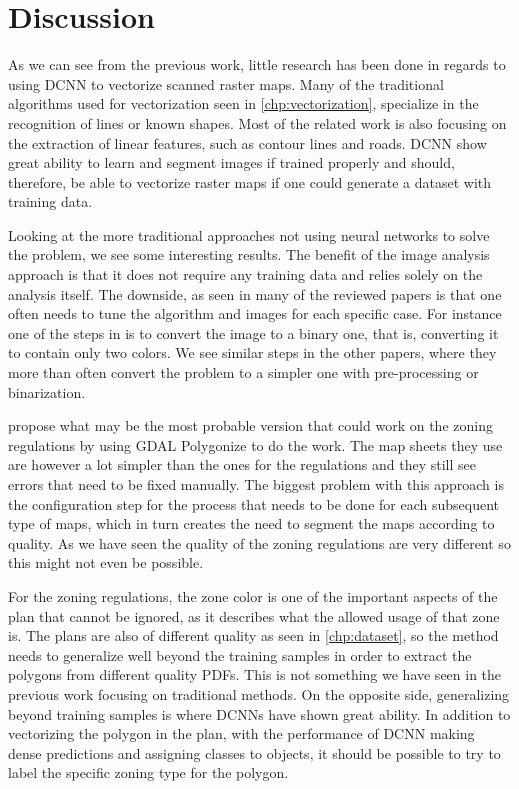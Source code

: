 \chapter{Discussion}
As we can see from the previous work, little research has been done in regards to using DCNN to vectorize scanned raster maps. Many of the traditional algorithms used for vectorization seen in \autoref{chp:vectorization}, specialize in the recognition of lines or known shapes. Most of the related work is also focusing on the extraction of linear features, such as contour lines and roads. DCNN show great ability to learn and segment images if trained properly and should, therefore, be able to vectorize raster maps if one could generate a dataset with training data.

Looking at the more traditional approaches not using neural networks to solve the problem, we see some interesting results. The benefit of the image analysis approach is that it does not require any training data and relies solely on the analysis itself. The downside, as seen in many of the reviewed papers is that one often needs to tune the algorithm and images for each specific case. For instance one of the steps in \citet{Iosifescu2016} is to convert the image to a binary one, that is, converting it to contain only two colors. We see similar steps in the other papers, where they more than often convert the problem to a simpler one with pre-processing or binarization. 

\citet{GiraldoArteaga2013} propose what may be the most probable version that could work on the zoning regulations by using GDAL Polygonize to do the work. The map sheets they use are however a lot simpler than the ones for the regulations and they still see errors that need to be fixed manually. The biggest problem with this approach is the configuration step for the process that needs to be done for each subsequent type of maps, which in turn creates the need to segment the maps according to quality. As we have seen the quality of the zoning regulations are very different so this might not even be possible.

For the zoning regulations, the zone color is one of the important aspects of the plan that cannot be ignored, as it describes what the allowed usage of that zone is. The plans are also of different quality as seen in \autoref{chp:dataset}, so the method needs to generalize well beyond the training samples in order to extract the polygons from different quality PDFs. This is not something we have seen in the previous work focusing on traditional methods. On the opposite side, generalizing beyond training samples is where DCNNs have shown great ability. In addition to vectorizing the polygon in the plan, with the performance of DCNN making dense predictions and assigning classes to objects, it should be possible to try to label the specific zoning type for the polygon.

